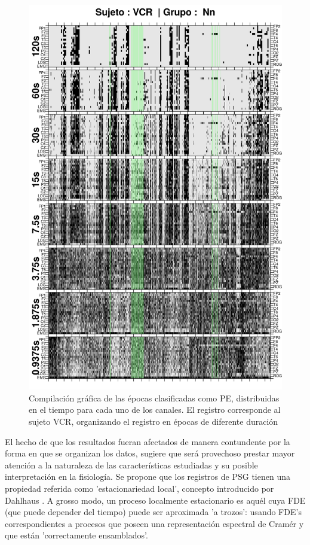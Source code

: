 \begin{figure}
\centering
\includegraphics[width=0.9\linewidth]
{./img_ejemplos/VCNNS1_comp_est_.png}
\caption{Compilación gráfica de las épocas clasificadas como PE, distribuidas en el tiempo
para cada uno de los canales. El registro corresponde al sujeto VCR, organizando el registro en
épocas de diferente duración}
\label{comp_VCR}
\end{figure}

El hecho de que los resultados fueran afectados de manera contundente por la forma en que se 
organizan los datos, sugiere que será provechoso prestar mayor atención a la naturaleza de las 
características estudiadas y su posible interpretación en la fisiología.
Se propone que los registros de PSG tienen una propiedad referida como 'estacionariedad local',
concepto introducido por Dahlhaus \cite{Dahlhaus97}.
A grosso modo, un proceso localmente estacionario es aquél cuya FDE (que puede depender del 
tiempo) puede ser aproximada 'a trozos': usando FDE's correspondientes a procesos que poseen una 
representación espectral de Cramér y que están 'correctamente ensamblados'.

